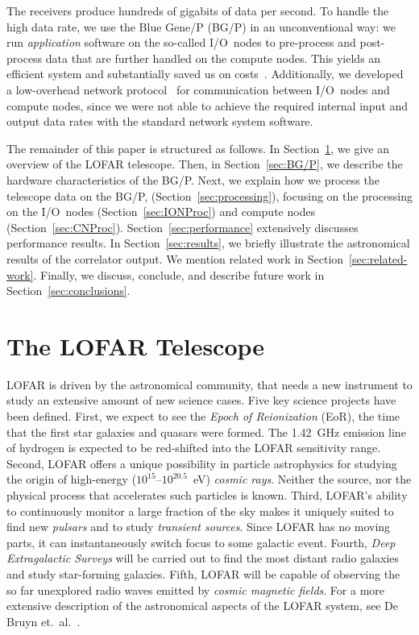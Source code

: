 \documentclass{sig-alternate}
\begin{document}
The receivers produce hundreds of gigabits of data per second.
To handle the high data rate,
we use the Blue Gene/P (BG/P) in an unconventional way: we run
\emph{application\/} software on the so-called I/O~nodes to pre-process and
post-process data that are further handled on the compute nodes.
This yields an efficient system and substantially saved us on
costs~\cite{Iskra:08}.
Additionally, we developed a low-overhead network protocol~\cite{Romein:09a}
for communication between I/O~nodes and compute nodes, since we were not able
to achieve the required internal input and output data rates with the standard
network system software.

The remainder of this paper is structured as follows.
In Section~\ref{sec:overview}, we give an overview of the LOFAR telescope.
Then, in Section~\ref{sec:BG/P}, we describe the hardware characteristics of
the BG/P.
Next, we explain how we process the telescope data on the BG/P,
(Section~\ref{sec:processing}), focusing on the processing on the I/O~nodes
(Section~\ref{sec:IONProc}) and compute nodes (Section~\ref{sec:CNProc}).
Section~\ref{sec:performance} extensively discusses performance results.
In Section~\ref{sec:results}, we briefly illustrate the astronomical results
of the correlator output.
We mention related work in Section~\ref{sec:related-work}.
Finally, we discuss, conclude, and describe future work in
Section~\ref{sec:conclusions}.


\section{The LOFAR Telescope}
\label{sec:overview}

LOFAR is driven by the astronomical community, that needs a new instrument
to study an extensive amount of new science cases.
Five key science projects have been defined.
First, we expect to see the \emph{Epoch of Reionization\/} (EoR), the time
that the first star galaxies and quasars were formed.
The 1.42~GHz emission line of hydrogen is expected to be
red-shifted into the LOFAR sensitivity range.
Second, LOFAR offers a unique possibility in particle astrophysics for
studying the origin of high-energy ($10^{15}$--$10^{20.5}$~eV)
\emph{cosmic rays}.
Neither the source, nor the physical process that accelerates such particles
is known.
Third, LOFAR's ability to continuously monitor a large fraction of the sky
makes it uniquely suited to find new \emph{pulsars} and to study \emph{transient sources}.
Since LOFAR has no moving parts, it can instantaneously switch focus to
some galactic event.
Fourth, \emph{Deep Extragalactic Surveys\/} will be carried out to find the
most distant radio galaxies and study star-forming galaxies.
Fifth, LOFAR will be capable of observing the so far unexplored radio
waves emitted by \emph{cosmic magnetic fields}.
For a more extensive description of the astronomical aspects of the LOFAR
system, see De Bruyn et.~al.~\cite{Bruyn:02}.
\end{document}
